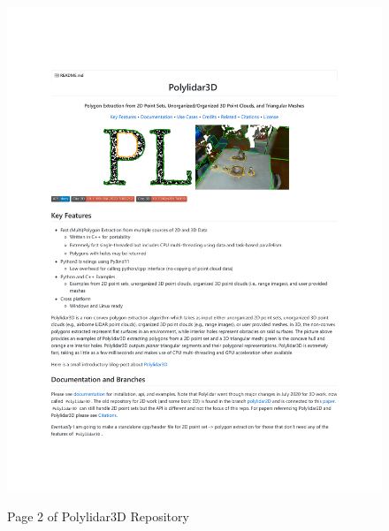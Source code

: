 \begin{figure}[h!]
    \centering\includegraphics[page=2, trim=1.0in 1.0in 1.0in 1.0in, width=.93\linewidth]{appendix_1/imgs/Polylidar3DReadme.pdf}
    \label{fig:apx1_pl2}
    \caption{Page 2 of Polylidar3D Repository} 
\end{figure}

